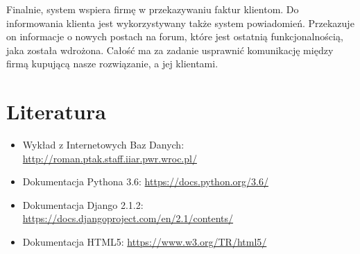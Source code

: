 \documentclass[12pt]{article}
\begin{document}
	Finalnie, system wspiera firmę w przekazywaniu faktur klientom. Do informowania klienta jest wykorzystywany także system powiadomień. Przekazuje on informacje o nowych postach na forum, które jest ostatnią funkcjonalnością, jaka została wdrożona. Całość ma za zadanie usprawnić komunikację między firmą kupującą nasze rozwiązanie, a jej klientami.
	
	\section{Literatura}
	\begin{itemize}
		\item Wykład z Internetowych Baz Danych: \url{http://roman.ptak.staff.iiar.pwr.wroc.pl/}
		\item Dokumentacja Pythona 3.6: \url{https://docs.python.org/3.6/}
		\item Dokumentacja Django 2.1.2: \url{https://docs.djangoproject.com/en/2.1/contents/}
		\item Dokumentacja HTML5: \url{https://www.w3.org/TR/html5/}
	\end{itemize}
	
\end{document}
